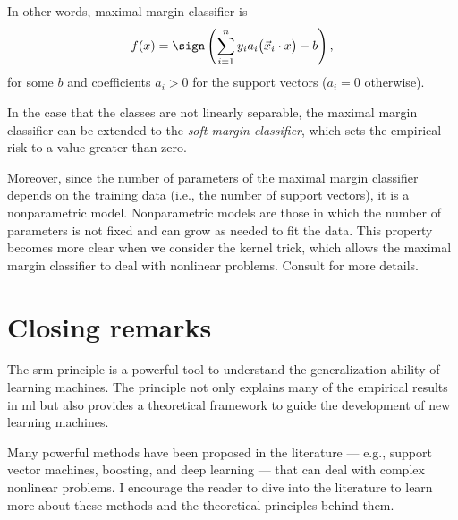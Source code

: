 In other words, maximal margin classifier is
\[
  f(x) = \sign\left(\sum_{i=1}^{n} y_i a_i \big(\vec{x}_i \cdot x\big) - b\right)\text{,}
\]
for some $b$ and coefficients $a_i > 0$ for the support vectors ($a_i = 0$ otherwise).

In the case that the classes are not linearly separable, the maximal margin classifier can
be extended to the \emph{soft margin classifier}, which sets the empirical risk to a value
greater than zero.

Moreover, since the number of parameters of the maximal margin classifier depends on the
training data (i.e., the number of support vectors), it is a nonparametric model.
Nonparametric models are those in which the number of parameters is not fixed and can grow
as needed to fit the data.  This property becomes more clear when we consider the kernel
trick, which allows the maximal margin classifier to deal with nonlinear problems.
Consult \textcite{Vapnik1999b} for more details.

\section{Closing remarks}

The \gls{srm} principle is a powerful tool to understand the generalization ability of
learning machines.  The principle not only explains many of the empirical results in
\gls{ml} but also provides a theoretical framework to guide the development of new
learning machines.

Many powerful methods have been proposed in the literature --- e.g., support vector
machines, boosting, and deep learning --- that can deal with complex nonlinear problems.
I encourage the reader to dive into the literature to learn more about these methods and
the theoretical principles behind them.

